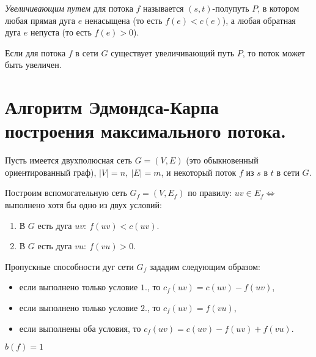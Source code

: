\begin{definition}
    \emph{Увеличивающим путем} для потока $ f $ называется $ (s,t) $-полупуть $ P $, в котором любая прямая дуга $ e $ ненасыщена (то есть $ f(e) < c(e) $), а любая обратная дуга $ e $ непуста (то есть $ f(e) > 0 $).
\end{definition}

\begin{lemma}
    Если для потока $ f $ в сети $ G $ существует увеличивающий путь $ P $, то поток может быть увеличен.
\end{lemma}

\section{Алгоритм Эдмондса-Карпа построения максимального потока.}

\begin{note}
    Пусть имеется двухполюсная сеть $ G = (V,E) $ (это обыкновенный ориентированный граф), $ | V | = n, \ | E | = m $, и некоторый поток $ f $ из $ s $ в $ t $ в сети $ G $.

    Построим вспомогательную сеть $ G_f = (V,E_f) $ по правилу: $ uv \in E_f \iff $ выполнено хотя бы одно из двух условий:
    \begin{enumerate}
        \item В $ G $ есть дуга $ uv: \ f(uv) < c(uv) $.
        \item В $ G $ есть дуга $ vu: \ f(vu) > 0 $.
    \end{enumerate}

    Пропускные способности дуг сети $ G_f $ зададим следующим образом:
    \begin{itemize}
        \item если выполнено только условие $ 1. $, то $ c_f(uv) = c(uv) - f(uv) $,
        \item если выполнено только условие $ 2. $, то $ c_f(uv) = f(vu) $,
        \item если выполнены оба условия, то $ c_f(uv) = c(uv) - f(uv) + f(vu) $.
    \end{itemize}
\end{note}

\begin{example}
    $ b(f) = 1$
    \begin{figure}[H]
        \centering
        \label{fig:fig_32}
    \end{figure}
\end{example}